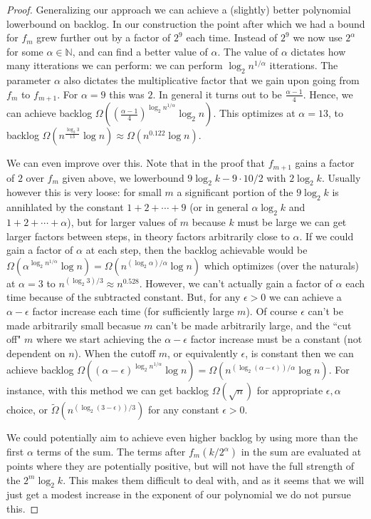 \documentclass[twocolumn]{article}[11pt]
\begin{document}
\begin{proof}
  Generalizing our approach we can achieve a (slightly) better polynomial
  lowerbound on backlog. In our construction the point after which we had a
  bound for $f_m$ grew further out by a factor of $2^9$ each time. Instead of
  $2^9$ we now use $2^\alpha$ for some $\alpha \in \mathbb{N}$, and can find a
  better value of $\alpha$. The value of $\alpha$ dictates how many
  itterations we can perform: we can perform $\log_2 n^{1/\alpha}$ itterations.
  The parameter $\alpha$ also dictates the multiplicative factor that we gain
  upon going from $f_m$ to $f_{m+1}$. For $\alpha = 9$ this was $2$. In general
  it turns out to be $\frac{\alpha -1}{4}$.  Hence, we can achieve backlog
  $\Omega\left(\left(\frac{\alpha -1}{4}\right)^{\log_2 n^{1/\alpha}}\log_2
  n\right)$. This optimizes at $\alpha = 13$, to backlog
  $\Omega(n^{\frac{\log_2 3}{13}}\log n) \approx \Omega(n^{0.122}\log n)$. 

  We can even improve over this. Note that in the proof that
  $f_{m+1}$ gains a factor of $2$ over $f_m$ given above, we lowerbound
  $9\log_2 k - 9\cdot 10 /2$ with $2\log_2 k$. Usually however this is very
  loose: for small $m$ a significant portion of the $9 \log_2 k$ is annihlated
  by the constant $1+2+\cdots+9$ (or in general $\alpha \log_2 k$ and
  $1+2+\cdots + \alpha$), but for larger values of $m$ because $k$ must be
  large we can get larger factors between steps, in theory factors arbitrarily
  close to $\alpha$. If we could gain a factor of $\alpha$ at each step, then
  the backlog achievable would be $\Omega(\alpha^{\log_2{n^{1/\alpha}}}\log n)=
  \Omega(n^{(\log_2{\alpha})/\alpha} \log n)$ which optimizes (over the
  naturals)
  at $\alpha = 3$ to $n^{(\log_2 3)/3} \approx n^{0.528}$. However, we can't
  actually gain a factor of $\alpha$ each time because of the subtracted
  constant. But, for any $\epsilon >0$ we can achieve a $\alpha - \epsilon$
  factor increase each time (for sufficiently large $m$). Of course $\epsilon$
  can't be made arbitrarily small becasue $m$ can't be made arbitrarily large,
  and the ``cut off" $m$ where we start achieving the $\alpha - \epsilon$
  factor increase must be a constant (not dependent on $n$). When the cutoff
  $m$, or equivalently $\epsilon$, is constant then we can achieve backlog
  $\Omega((\alpha - \epsilon)^{\log_2{n^{1/\alpha}}}\log n)=
  \Omega(n^{(\log_2(\alpha - \epsilon))/\alpha} \log n)$. For instance, with
  this method we can get backlog $\Omega(\sqrt{n})$ for appropriate $\epsilon,
  \alpha$ choice, or $\tilde{\Omega}(n^{(\log_2 (3 - \epsilon))/3})$ for any
  constant $\epsilon >0$. 

  We could potentially aim to achieve even higher
  backlog by using more than the first $\alpha$ terms of the sum. The terms
  after $f_m(k/2^\alpha)$ in the sum are evaluated at points where they are
  potentially positive, but will not have the full strength of the $2^m \log_2
  k$. This makes them difficult to deal with, and as it seems that we will just
  get a modest increase in the exponent of our polynomial we do not pursue
  this. 
\end{proof}
\end{document}
